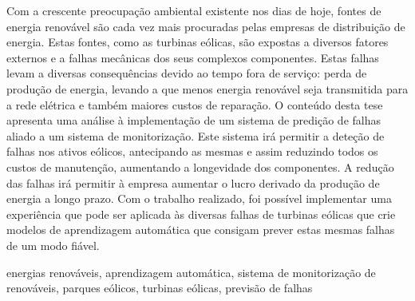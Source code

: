 




Com a crescente preocupação ambiental existente nos dias de hoje, fontes de energia renovável são cada vez mais procuradas pelas empresas de distribuição de energia. Estas fontes, como as turbinas eólicas, são expostas a diversos fatores externos e a falhas mecânicas dos seus complexos componentes. Estas falhas levam a diversas consequências devido ao tempo fora de serviço: perda de produção de energia, levando a que menos energia renovável seja transmitida para a rede elétrica e também maiores custos de reparação. O conteúdo desta tese apresenta uma análise à implementação de um sistema de predição de falhas aliado a um sistema de monitorização. Este sistema irá permitir a deteção de falhas nos ativos eólicos, antecipando as mesmas e assim reduzindo todos os custos de manutenção, aumentando a longevidade dos componentes. A redução das falhas irá permitir à empresa aumentar o lucro derivado da produção de energia a longo prazo.
Com o trabalho realizado, foi possível implementar uma experiência que pode ser aplicada às diversas falhas de turbinas eólicas que crie modelos de aprendizagem automática que consigam prever estas mesmas falhas de um modo fiável.

\begin{keywords}
energias renováveis, aprendizagem automática, sistema de monitorização de renováveis, parques eólicos, turbinas eólicas, previsão de falhas
\end{keywords}

